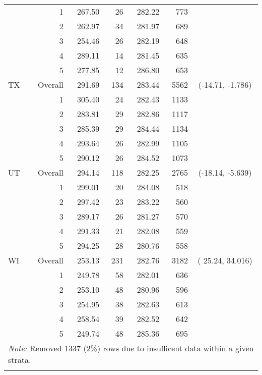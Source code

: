 \begin{longtable}{lrrr@{\extracolsep{.25cm}}rrc}
   & 1 & 267.50 &  26 & 282.22 & 773 &  \\ 
   & 2 & 262.97 &  34 & 281.97 & 689 &  \\ 
   & 3 & 254.46 &  26 & 282.19 & 648 &  \\ 
   & 4 & 289.11 &  14 & 281.45 & 635 &  \\ 
   & 5 & 277.85 &  12 & 286.80 & 653 &  \\ 
   \hline
TX & Overall & 291.69 & 134 & 283.44 & 5562 & (-14.71,  -1.786) \\ 
   & 1 & 305.40 &  24 & 282.43 & 1133 &  \\ 
   & 2 & 283.81 &  29 & 282.86 & 1117 &  \\ 
   & 3 & 285.39 &  29 & 284.44 & 1134 &  \\ 
   & 4 & 293.64 &  26 & 282.99 & 1105 &  \\ 
   & 5 & 290.12 &  26 & 284.52 & 1073 &  \\ 
   \hline
UT & Overall & 294.14 & 118 & 282.25 & 2765 & (-18.14,  -5.639) \\ 
   & 1 & 299.01 &  20 & 284.08 & 518 &  \\ 
   & 2 & 297.42 &  23 & 283.22 & 560 &  \\ 
   & 3 & 289.17 &  26 & 281.27 & 570 &  \\ 
   & 4 & 291.33 &  21 & 282.08 & 559 &  \\ 
   & 5 & 294.25 &  28 & 280.76 & 558 &  \\ 
   \hline
WI & Overall & 253.13 & 231 & 282.76 & 3182 & ( 25.24,  34.016) \\ 
   & 1 & 249.78 &  58 & 282.01 & 636 &  \\ 
   & 2 & 253.10 &  48 & 280.96 & 596 &  \\ 
   & 3 & 254.95 &  38 & 282.63 & 613 &  \\ 
   & 4 & 258.54 &  39 & 282.52 & 642 &  \\ 
   & 5 & 249.74 &  48 & 285.36 & 695 &  \\ 
   \hline \multicolumn{7}{l}{\textit{Note:} Removed 1337 (2\%) rows due to insufficent data within a given strata.} \\\hline
\label{g8math-mlpsa-lrAIC}
\end{longtable}
